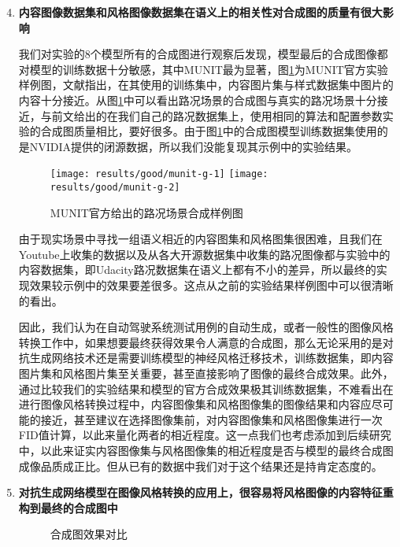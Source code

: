 \begin{enumerate}[itemindent=20pt, listparindent = 0.7cm]
    \setcounter{enumi}{3}
    \item \textbf{内容图像数据集和风格图像数据集在语义上的相关性对合成图的质量有很大影响}
    
    我们对实验的8个模型所有的合成图进行观察后发现，模型最后的合成图像都对模型的训练数据十分敏感，其中MUNIT最为显著，图\ref{fig:g-munit}为MUNIT官方实验样例图，文献\cite{MUNIT}指出，在其使用的训练集中，内容图片集与样式数据集中图片的内容十分接近。从图\ref{fig:g-munit}中可以看出路况场景的合成图与真实的路况场景十分接近，与前文给出的在我们自己的路况数据集上，使用相同的算法和配置参数实验的合成图质量相比，要好很多。由于图\ref{fig:g-munit}中的合成图模型训练数据集使用的是NVIDIA提供的闭源数据，所以我们没能复现其示例中的实验结果。
    
    \begin{figure}[]
        \centering
        \texttt{[image: results/good/munit-g-1]}
        \texttt{[image: results/good/munit-g-2]}
        \caption{MUNIT官方给出的路况场景合成样例图}
        \label{fig:g-munit}
    \end{figure}

    由于现实场景中寻找一组语义相近的内容图集和风格图集很困难，且我们在Youtube上收集的数据以及从各大开源数据集中收集的路况图像都与实验中的内容数据集，即Udacity路况数据集在语义上都有不小的差异，所以最终的实现效果较示例中的效果要差很多。这点从之前的实验结果样例图中可以很清晰的看出。 

    因此，我们认为在自动驾驶系统测试用例的自动生成，或者一般性的图像风格转换工作中，如果想要最终获得效果令人满意的合成图，那么无论采用的是对抗生成网络技术还是需要训练模型的神经风格迁移技术，训练数据集，即内容图片集和风格图片集至关重要，甚至直接影响了图像的最终合成效果。此外，通过比较我们的实验结果和模型的官方合成效果极其训练数据集，不难看出在进行图像风格转换过程中，内容图像集和风格图像集的图像结果和内容应尽可能的接近，甚至建议在选择图像集前，对内容图像集和风格图像集进行一次FID值计算，以此来量化两者的相近程度。这一点我们也考虑添加到后续研究中，以此来证实内容图像集与风格图像集的相近程度是否与模型的最终合成图成像品质成正比。但从已有的数据中我们对于这个结果还是持肯定态度的。

    \item \textbf{对抗生成网络模型在图像风格转换的应用上，很容易将风格图像的内容特征重构到最终的合成图中}
    
    \begin{figure}[h]
        \centering
        \caption{合成图效果对比}
        \label{fig:new}
    \end{figure}


\end{enumerate}
